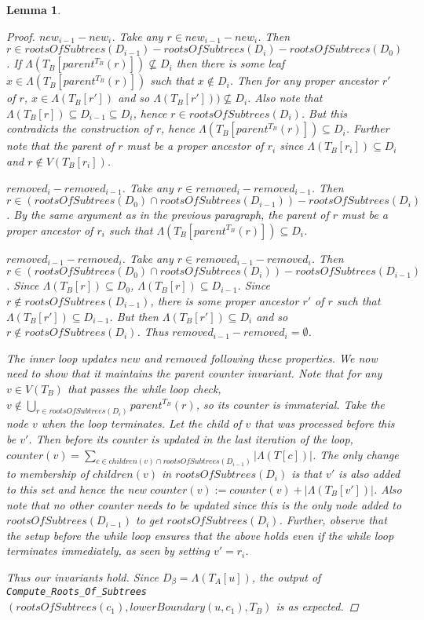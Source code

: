 \documentclass{article}
\newcommand{\leafset}{\Lambda}
\newtheorem{computerootsofsubtreescorrectness}[incompatibility]{Lemma}
\begin{document}
\begin{computerootsofsubtreescorrectness}
\begin{proof}
            \textit{$new_{i-1} - new_i$.} Take any $r \in new_{i-1} - new_i$. Then $r \in rootsOfSubtrees(D_{i-1}) - rootsOfSubtrees(D_i) - rootsOfSubtrees(D_0)$. If $\leafset(T_B[parent^{T_B}(r)]) \not\subseteq D_i$ then there is some leaf $x \in \leafset(T_B[parent^{T_B}(r)])$ such that $x \not\in D_i$. Then for any proper ancestor $r'$ of $r$, $x \in \leafset(T_B[r'])$ and so $\leafset(T_B[r'])) \not\subseteq D_i$. Also note that $\leafset(T_B[r]) \subseteq D_{i-1} \subseteq D_i$, hence $r \in rootsOfSubtrees(D_i)$. But this contradicts the construction of $r$, hence $\leafset(T_B[parent^{T_B}(r)]) \subseteq D_i$. Further note that the parent of $r$ must be a proper ancestor of $r_i$ since $\leafset(T_B[r_i]) \subseteq D_i$ and $r \not\in V(T_B[r_i])$.

            \textit{$removed_i - removed_{i-1}$.} Take any $r \in removed_i - removed_{i-1}$. Then $r \in (rootsOfSubtrees(D_0) \cap rootsOfSubtrees(D_{i-1})) - rootsOfSubtrees(D_i)$. By the same argument as in the previous paragraph, the parent of $r$ must be a proper ancestor of $r_i$ such that $\leafset(T_B[parent^{T_B}(r)]) \subseteq D_i$.

            \textit{$removed_{i-1} - removed_i$.} Take any $r \in removed_{i-1} - removed_i$. Then $r \in (rootsOfSubtrees(D_0) \cap rootsOfSubtrees(D_i)) - rootsOfSubtrees(D_{i-1})$. Since $\leafset(T_B[r]) \subseteq D_0$, $\leafset(T_B[r]) \subseteq D_{i-1}$. Since $r \not\in rootsOfSubtrees(D_{i-1})$, there is some proper ancestor $r'$ of $r$ such that $\leafset(T_B[r']) \subseteq D_{i-1}$. But then $\leafset(T_B[r']) \subseteq D_i$ and so $r \not\in rootsOfSubtrees(D_i)$. Thus $removed_{i-1} - removed_i = \emptyset$.

            The inner loop updates $new$ and $removed$ following these properties. We now need to show that it maintains the parent counter invariant. Note that for any $v \in V(T_B)$ that passes the while loop check, $v \not\in \bigcup_{r \in rootsOfSubtrees(D_i)} parent^{T_B}(r)$, so its counter is immaterial. Take the node $v$ when the loop terminates. Let the child of $v$ that was processed before this be $v'$. Then before its counter is updated in the last iteration of the loop, $counter(v) = \sum_{c \in children(v) \cap rootsOfSubtrees(D_{i-1})} |\leafset(T[c])|$. The only change to membership of $children(v)$ in $rootsOfSubtrees(D_i)$ is that $v'$ is also added to this set and hence the new $counter(v) := counter(v) + |\leafset(T_B[v'])|$. Also note that no other counter needs to be updated since this is the only node added to $rootsOfSubtrees(D_{i-1})$ to get $rootsOfSubtrees(D_i)$. Further, observe that the setup before the while loop ensures that the above holds even if the while loop terminates immediately, as seen by setting $v' = r_i$.

            Thus our invariants hold. Since $D_{\beta} = \leafset(T_A[u])$, the output of \texttt{Compute\_Roots\_Of\_Subtrees}$(rootsOfSubtrees(c_1), lowerBoundary(u, c_1), T_B)$ is as expected.
        \end{proof}
    \end{computerootsofsubtreescorrectness}
\end{document}
